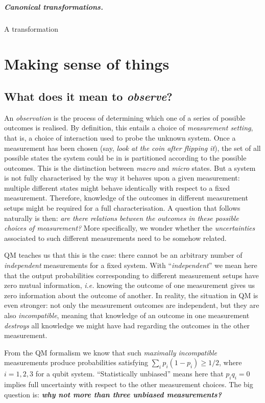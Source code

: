 \documentclass[12pt]{report}
\begin{document}
\paragraph{Canonical transformations.}
A transformation 

\chapter{Making sense of things}

\section{What does it mean to \emph{observe}?}

An \emph{observation} is the process of determining which one of a series of possible outcomes is realised. By definition, this entails a choice of \emph{measurement setting}, that is, a choice of interaction used to probe the unknown system.
Once a measurement has been chosen (say, \emph{look at the coin after flipping it}), the set of all possible states the system could be in is partitioned according to the possible outcomes. This is the distinction between \emph{macro} and \emph{micro} states.
But a system is not fully characterised by the way it behaves upon a given measurement: multiple different states might behave identically with respect to a fixed measurement. Therefore, knowledge of the outcomes in different measurement setups might be required for a full characterisation.
A question that follows naturally is then: \emph{are there relations between the outcomes in these possible choices of measurement?}
More specifically, we wonder whether the \emph{uncertainties} associated to such different measurements need to be somehow related.

QM teaches us that this is the case: there cannot be an arbitrary number of \emph{independent} measurements for a fixed system.
With ``\emph{independent}'' we mean here that the output probabilities corresponding to different measurement setups have zero mutual information, \emph{i.e.} knowing the outcome of one measurement gives us zero information about the outcome of another.
In reality, the situation in QM is even stronger: not only the measurement outcomes are independent, but they are also \emph{incompatible}, meaning that knowledge of an outcome in one measurement \emph{destroys} all knowledge we might have had regarding the outcomes in the other measurement.

From the QM formalism we know that such \emph{maximally incompatible} measurements produce probabilities satisfying $\sum_i p_i (1-p_i)\ge1/2$, where $i=1,2,3$ for a qubit system.
``Statistically unbiased'' means here that $p_i q_i=0$ implies full uncertainty with respect to the other measurement choices. The big question is: \textcolor{RedOrange}{\emph{\textbf{why not more than three unbiased measurements?}}}
\end{document}

